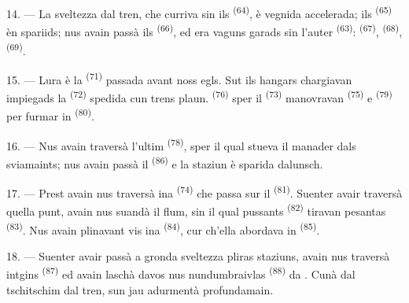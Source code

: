 \VUsaut{3.0mm}
\VUsaut{3.0mm}

14. --- La sveltezza dal tren, che curriva sin ils  \textsuperscript{(64)},
è vegnida accelerada; ils  \textsuperscript{(65)} èn spariids; nus avain
passà ils  \textsuperscript{(66)}, ed era vaguns garads sin l'auter
 \textsuperscript{(63)}:  \textsuperscript{(67)},
 \textsuperscript{(68)},  \textsuperscript{(69)}.


15. --- Lura è la  \textsuperscript{(71)} passada avant noss
egls. Sut ils hangars chargiavan impiegads la  \textsuperscript{(72)}
spedida cun trens plaun.  \textsuperscript{(76)} sper il  \textsuperscript{(73)} manovravan  \textsuperscript{(75)} e
 \textsuperscript{(79)} per furmar in 
\textsuperscript{(80)}.

16. --- Nus avain traversà l'ultim  \textsuperscript{(78)}, sper il qual
stueva il manader dals sviamaints; nus avain passà il 
\textsuperscript{(86)} e la staziun è sparida dalunsch.

17. --- Prest avain nus traversà ina  \textsuperscript{(74)} che passa
sur il  \textsuperscript{(81)}. Suenter avair traversà quella punt, avain nus
suandà il flum, sin il qual pussants  \textsuperscript{(82)} tiravan
pesantas  \textsuperscript{(83)}. Nus avain plinavant vis ina
 \textsuperscript{(84)}, cur ch'ella abordava in 
\textsuperscript{(85)}.

18. --- Suenter avair passà a gronda sveltezza pliras staziuns, avain nus traversà
intgins  \textsuperscript{(87)} ed avain laschà davos nus
 nundumbraivlas \textsuperscript{(88)} da . Cunà dal tschitschim dal tren,
sun jau adurmentà profundamain.

\VUsaut{3.0mm}
\VUsaut{3.0mm}


